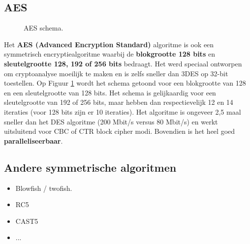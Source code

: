 \documentclass{report}
\begin{document}
	\subsection{AES}
	\begin{figure}[ht]
		\caption{AES schema.}
		\label{fig:AES}
	\end{figure}

	Het \textbf{AES (Advanced Encryption Standard)} algoritme is ook een symmetrisch encryptiealgoritme waarbij de \textbf{blokgrootte 128 bits} en \textbf{sleutelgrootte 128, 192 of 256 bits} bedraagt. Het werd speciaal ontworpen om cryptoanalyse moeilijk te maken en is zelfs sneller dan 3DES op 32-bit toestellen. Op Figuur \ref{fig:AES} wordt het schema getoond voor een blokgrootte van 128 en een sleutelgrootte van 128 bits. Het schema is gelijkaardig voor een sleutelgrootte van 192 of 256 bits, maar hebben dan respectievelijk 12 en 14 iteraties (voor 128 bits zijn er 10 iteraties). Het algoritme is ongeveer 2,5 maal sneller dan het DES algoritme (200 Mbit/s versus 80 Mbit/s) en werkt uitsluitend voor CBC of CTR block cipher modi. Bovendien is het heel goed \textbf{paralleliseerbaar}.
	\subsection{Andere symmetrische algoritmen}
	\begin{itemize}
		\item[\info] Blowfish / twofish.
		\item[\info] RC5
		\item[\info] CAST5 
		\item[\info]...
	\end{itemize}
\end{document}
